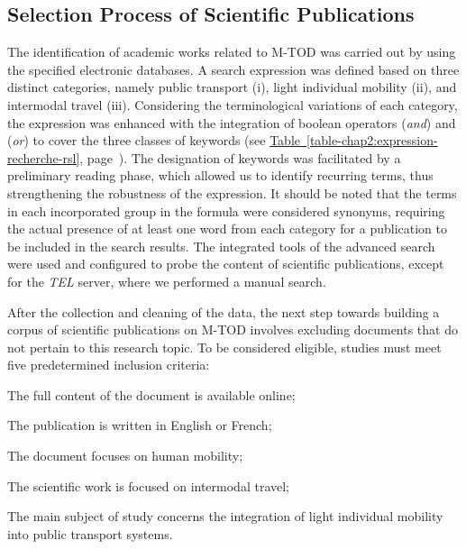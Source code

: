 \begin{refsegment}
\subsection{Selection Process of Scientific Publications
    \label{chap2:selection-publications-scientifiques}
    }


The identification of academic works related to \acrshort{M-TOD} was carried out by using the specified electronic databases. A search expression was defined based on three distinct categories, namely public transport (i), light individual mobility (ii), and intermodal travel (iii). Considering the terminological variations of each category, the expression was enhanced with the integration of boolean operators  (\textsl{and}) and  (\textsl{or}) to cover the three classes of keywords (see \hyperref[table-chap2:expression-recherche-rsl]{Table~\ref{table-chap2:expression-recherche-rsl}}, page~\pageref{table-chap2:expression-recherche-rsl}). The designation of keywords was facilitated by a preliminary reading phase, which allowed us to identify recurring terms, thus strengthening the robustness of the expression. It should be noted that the terms in each incorporated group in the formula were considered synonyms, requiring the actual presence of at least one word from each category for a publication to be included in the search results. The integrated tools of the advanced search were used and configured to probe the content of scientific publications, except for the \textsl{TEL} server, where we performed a manual search.%

After the collection and cleaning of the data, the next step towards building a corpus of scientific publications on \acrshort{M-TOD} involves excluding documents that do not pertain to this research topic. To be considered eligible, studies must meet five predetermined inclusion criteria:
    \begin{customitemize}
        \item The full content of the document is available online;
        \item The publication is written in English or French;
        \item The document focuses on human mobility;
        \item The scientific work is focused on intermodal travel;
        \item The main subject of study concerns the integration of light individual mobility into public transport systems.
    \end{customitemize}%


\end{refsegment}
